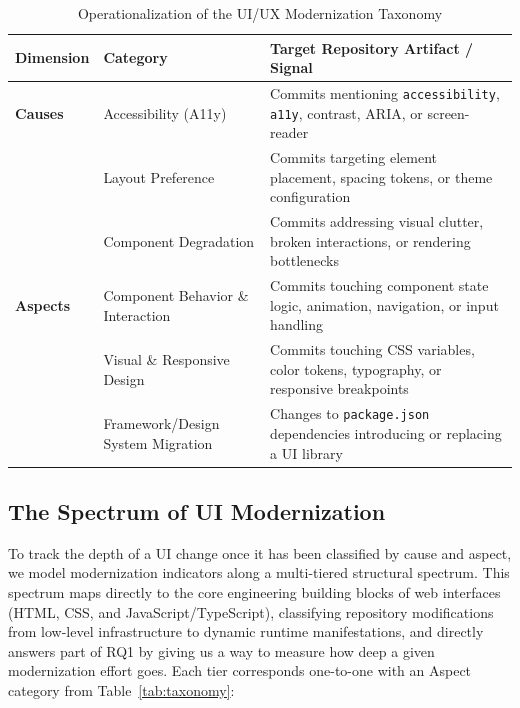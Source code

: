 \documentclass{article}
\begin{document}
\begin{table}[htbp]
\centering
\caption{Operationalization of the UI/UX Modernization Taxonomy}
\label{tab:operationalization}
\begin{tabularx}{\textwidth}{l l X}
\toprule
\textbf{Dimension} & \textbf{Category} & \textbf{Target Repository Artifact / Signal} \\
\midrule
\textbf{Causes} & Accessibility (A11y) & Commits mentioning \texttt{accessibility}, \texttt{a11y}, contrast, ARIA, or screen-reader \cite{khalajzadeh2022how} \\
& Layout Preference & Commits targeting element placement, spacing tokens, or theme configuration \cite{khalajzadeh2022how} \\
& Component Degradation & Commits addressing visual clutter, broken interactions, or rendering bottlenecks \cite{khalajzadeh2022how} \\
\midrule
\textbf{Aspects} & Component Behavior \& Interaction & Commits touching component state logic, animation, navigation, or input handling \cite{lamine2022understanding} \\
& Visual \& Responsive Design & Commits touching CSS variables, color tokens, typography, or responsive breakpoints \cite{lamine2022understanding, wang2022how} \\
& Framework/Design System Migration & Changes to \texttt{package.json} dependencies introducing or replacing a UI library \cite{wang2022how, lamine2022understanding} \\
\bottomrule
\end{tabularx}
\end{table}

\newpage
\subsection{The Spectrum of UI Modernization}
\label{sec:spectrum}

To track the depth of a UI change once it has been classified by cause and
aspect, we model modernization indicators along a multi-tiered structural
spectrum. This spectrum maps directly to the core engineering building
blocks of web interfaces (HTML, CSS, and JavaScript/TypeScript),
classifying repository modifications from low-level infrastructure to
dynamic runtime manifestations, and directly answers part of RQ1 by giving
us a way to measure how deep a given modernization effort goes. Each tier
corresponds one-to-one with an Aspect category from Table~\ref{tab:taxonomy}:
\end{document}
